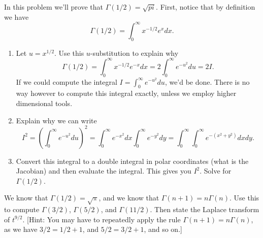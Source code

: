 \begin{problem}[$\Gamma(1/2)=\sqrt{\pi}$]
In this problem we'll prove that $\Gamma(1/2)=\sqrt{pi}$.  First, notice that by definition we have 
$$\Gamma(1/2) = \int_0^\infty x^{-1/2}e^{x}dx.$$
\begin{enumerate}
 \item Let $u=x^{1/2}$. Use this $u$-substitution to explain why 
$$
\Gamma(1/2)=\int_0^\infty x^{-1/2}e^{-x}dx = 
2\int_0^\infty e^{-u^2}du = 2I
.$$
 If we could compute the integral $I=\int_0^\infty e^{-u^2}du$, we'd be done. There is no way however to compute this integral exactly, unless we employ higher dimensional tools.
\item Explain why we can write
$$
I^2=\left(\int_0^\infty e^{-u^2}du\right)^2 
= \int_0^\infty e^{-x^2}dx\int_0^\infty e^{-y^2}dy 
= \int_0^\infty\int_0^\infty e^{-(x^2+y^2)}dxdy.
$$
  \item Convert this integral to a double integral in polar coordinates (what is the Jacobian) and then evaluate the integral. This gives you $I^2$. Solve for $\Gamma(1/2)$.  
\end{enumerate}

 
\end{problem}


\begin{problem}
 We know that $\Gamma(1/2) = \sqrt{\pi}$, and we know that $\Gamma(n+1)=n\Gamma(n)$.  Use this to compute $\Gamma(3/2)$, $\Gamma(5/2)$, and $\Gamma(11/2)$. Then state the Laplace transform of $t^{9/2}$.  [Hint: You may have to repeatedly apply the rule $\Gamma(n+1)=n\Gamma(n)$, as we have $3/2=1/2+1$, and $5/2=3/2+1$, and so on.]
\end{problem}







































